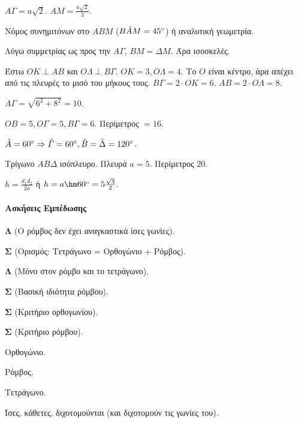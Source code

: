 \documentclass[11pt,a4paper,modern]{FFExercises}
\begin{document}
\begin{alist}
    \item $A\varGamma = a\sqrt{2}$. $AM = \frac{a\sqrt{2}}{3}$.
    \item Νόμος συνημιτόνων στο $ABM$ ($\hat{BAM}=45\degree$) ή αναλυτική γεωμετρία.
    \item Λόγω συμμετρίας ως προς την $A\varGamma$, $BM = \Delta M$. Άρα ισοσκελές.
\end{alist}

\begin{alist}
    \item Έστω $OK \perp AB$ και $O\Lambda \perp B\varGamma$. $OK=3, O\Lambda=4$. Το $O$ είναι κέντρο, άρα απέχει από τις πλευρές το μισό του μήκους τους.
    $B\varGamma = 2 \cdot OK = 6$. $AB = 2 \cdot O\Lambda = 8$.
    \item $A\varGamma = \sqrt{6^2+8^2} = 10$.
    \item $OB = 5, O\varGamma = 5, B\varGamma = 6$. Περίμετρος $= 16$.
\end{alist}

\begin{alist}
    \item $\hat{A}=60\degree \Rightarrow \hat{\varGamma}=60\degree, \hat{B}=\hat{\Delta}=120\degree$.
    \item Τρίγωνο $AB\Delta$ ισόπλευρο. Πλευρά $a=5$. Περίμετρος $20$.
    \item $h = \frac{d_1 d_2}{2a}$ ή $h = a \hm 60\degree = 5 \frac{\sqrt{3}}{2}$.
\end{alist}

\paragraph{Ασκήσεις Εμπέδωσης}

\begin{alist}
    \item \textbf{Λ} (Ο ρόμβος δεν έχει αναγκαστικά ίσες γωνίες).
    \item \textbf{Σ} (Ορισμός: Τετράγωνο = Ορθογώνιο + Ρόμβος).
    \item \textbf{Λ} (Μόνο στον ρόμβο και το τετράγωνο).
    \item \textbf{Σ} (Βασική ιδιότητα ρόμβου).
    \item \textbf{Σ} (Κριτήριο ορθογωνίου).
    \item \textbf{Σ} (Κριτήριο ρόμβου).
\end{alist}

\begin{alist}
    \item Ορθογώνιο.
    \item Ρόμβος.
    \item Τετράγωνο.
    \item Ίσες, κάθετες, διχοτομούνται (και διχοτομούν τις γωνίες του).
\end{alist}
\end{document}
